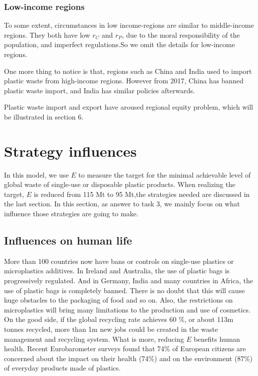\documentclass{mcmthesis}
\begin{document}
 \subsubsection{Low-income regions}
	 To some extent, circumstances in low income-regions are similar to middle-income regions. They both have low $r_C$ and $r_P$, due to the moral responsibility of the population, and imperfect regulations.So we omit the details for low-income regions. \par 
	 One more thing to notice is that, regions such as China and India used to import plastic waste from high-income regions. However from 2017, China has banned plastic waste import, and India has similar policies afterwards. 

	 Plastic waste import and export have aroused regional equity problem, which will be illustrated in section 6.

	

	 \section{Strategy influences}
	 In this model, we use $E$ to measure the target for the minimal achievable level of global waste of single-use or disposable plastic products. When realizing the target, $E$ is reduced from 115 Mt to 95 Mt,the strategies needed are discussed in the last section. 
	 In this section, as answer to task 3, we mainly focus on what influence those strategies are going to make.
	  \subsection{Influences on human life}
		  More than 100 countries now have bans or controls on single-use plastics or microplastics additives.\cite{EUReport}
		 In Ireland and Australia, the use of plastic bags is progressively regulated. And in Germany, India and many countries in Africa, the use of plastic bags is completely banned\cite{xanthos2017international}. There is no doubt that this will cause huge obstacles to the packaging of food and so on. Also, the restrictions on microplastics will bring many limitations to the production and use of cosmetics.
		 On the good side, if the global recycling rate  achieves  60 \%, or about 113m tonnes recycled, more than 1m new jobs could be created in the waste management and recycling system.\cite{WWFReport}
		 What is more, reducing $E$ benefits human health. Recent Eurobarometer surveys found that 74\% of European citizens are 
		 concerned about the impact on their health (74\%) and on the environment (87\%) of everyday 
		 products made of plastics.\cite{eu2018assesment}
\end{document}
